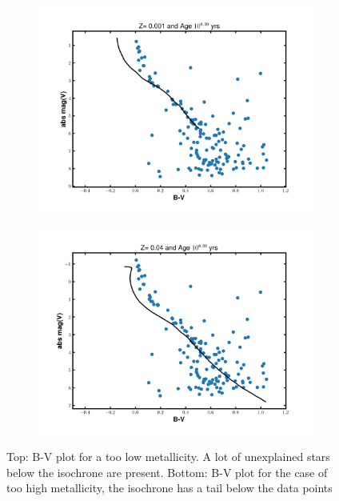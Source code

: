 \documentclass[12pt]{article}
\begin{document}
\begin{figure}[H]
    \centering
    \begin{subfigure}{.8\textwidth}
        \centering
        \includegraphics[width=\linewidth]{fig/iso_z001_839.png}
        \caption{}
    \end{subfigure}

    \begin{subfigure}{.8\textwidth}
        \centering
        \includegraphics[width=\linewidth]{fig/iso_z040_839.png}
        \caption{}
    \end{subfigure}
    \caption{Top: B-V plot for a too low metallicity. A lot of unexplained stars below the isochrone are present. Bottom: B-V plot for the case of too high metallicity, the isochrone has a tail below the data points}
    \label{exclusion}
\end{figure}
\end{document}
